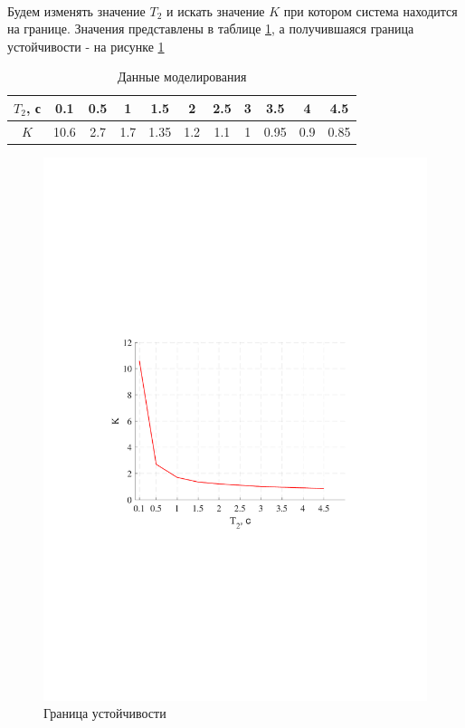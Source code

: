 \documentclass[a4paper,12pt]{article}
\begin{document}
	\paragraph{} Будем изменять значение $T_2$ и искать значение $K$ при котором система находится на границе. Значения представлены в таблице \ref{t_1}, а получившаяся граница устойчивости - на рисунке \ref{s_3}
	\begin{table}[h]
		\caption{Данные моделирования}
		\renewcommand{\arraystretch}{2} 
		\renewcommand{\tabcolsep}{0.5cm}
		\begin{center}
			\begin{tabular}{|c|c|c|c|c|c|c|c|c|c|c|}
				\hline
				$T_2$, с & 0.1 & 0.5 & 1 & 1.5 & 2 & 2.5 & 3 & 3.5 & 4 & 4.5 \\ \hline
				$K$ & 10.6 & 2.7 & 1.7 & 1.35 & 1.2 & 1.1 & 1 & 0.95 & 0.9 & 0.85 \\ \hline
			\end{tabular}
		\end{center}
		\label{t_1}
	\end{table}
	\begin{figure}[h!]
		\renewcommand{\figurename}{Рисунок}
		\centering
		\includegraphics[width=6in]{GranitsaMOD.pdf}
		\caption{Граница устойчивости}
		\label{s_3}
	\end{figure}
\end{document}
